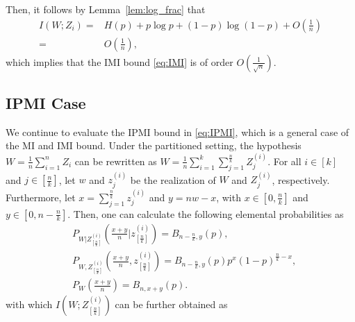 \documentclass[onecolumn,romanappendices,10pt]{IEEEtran}
\begin{document}
	Then, it follows by Lemma~\ref{lem:log_frac} that
	\begin{equation}
		\begin{aligned}
			I\left( W; Z_i \right) =& H(p) + p \log p + (1 - p) \log (1 - p) + O\left( \frac{1}{n} \right) \\
			=& O\left( \frac{1}{n} \right),
		\end{aligned}
	\end{equation}
	which implies that the IMI bound \eqref{eq:IMI} is of order $O\left( \frac{1}{\sqrt{n}} \right)$.
	
	\subsection{IPMI Case} \label{subapp:cal_IPMI}
	We continue to evaluate the IPMI bound in \eqref{eq:IPMI}, which is a general case of the MI and IMI bound. Under the partitioned setting, the hypothesis $W = \frac{1}{n} \sum_{i=1}^{n} Z_i$ can be rewritten as $W = \frac{1}{n} \sum_{i=1}^{k} \sum_{j=1}^{\frac{n}{k}} Z^{(i)}_j$. For all $i \in [k]$ and $j \in [\frac{n}{k}]$, let $w$ and $z^{(i)}_j $ be the realization of $W$ and $Z^{(i)}_j$, respectively. Furthermore, let $x = \sum_{j=1}^{\frac{n}{k}} z^{(i)}_j$ and $y = n w - x$, with $x \in [0, \frac{n}{k}]$ and $y \in [0, n - \frac{n}{k}]$. Then, one can calculate the following elemental probabilities as
	\begin{align}
		&P_{W | Z_{[\frac{n}{k}]}^{(i)}}(\frac{x + y}{n} | z_{[\frac{n}{k}]}^{(i)}) = B_{n - \frac{n}{k}, y} (p), \\
		&P_{W, Z_{[\frac{n}{k}]}^{(i)}}(\frac{x + y}{n}, z_{[\frac{n}{k}]}^{(i)}) = B_{n - \frac{n}{k}, y} (p) p^{x} (1-p)^{\frac{n}{k}-x}, \\
		&P_{W}(\frac{x + y}{n}) = B_{n, x+y} (p).
	\end{align}
	with which $I( W; Z_{[\frac{n}{k}]}^{(i)} )$ can be further obtained as
\end{document}
